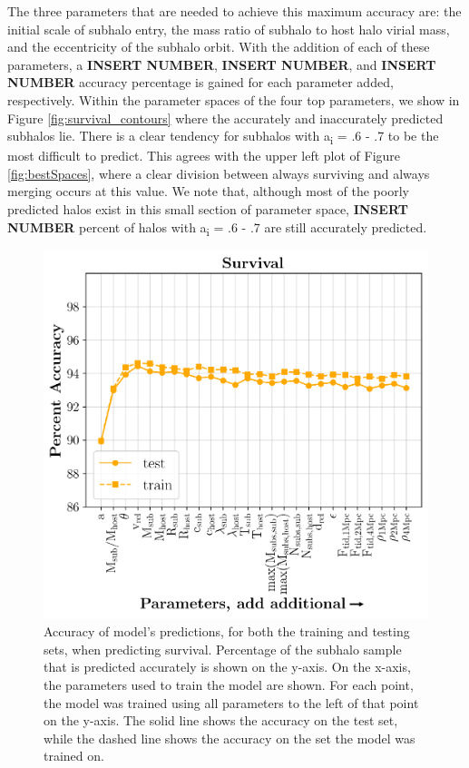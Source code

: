 \documentclass[fleqn,usenatbib]{mnras}
\begin{document}
The three parameters that are needed to achieve this maximum accuracy are: the initial scale of subhalo entry, the mass ratio of subhalo to host halo virial mass, and the eccentricity of the subhalo orbit. With the addition of each of these parameters, a \textbf{INSERT NUMBER}, \textbf{INSERT NUMBER}, and  \textbf{INSERT NUMBER} accuracy percentage is gained for each parameter added, respectively. Within the parameter spaces of the four top parameters, we show in Figure \ref{fig:survival_contours} where the accurately and inaccurately predicted subhalos lie. There is a clear tendency for subhalos with a\textsubscript{i} =  .6 - .7 to be the most difficult to predict. This agrees with the upper left plot of Figure \ref{fig:bestSpaces}, where a clear division between always surviving and always merging occurs at this value. We note that, although most of the poorly predicted halos exist in this small section of parameter space, \textbf{INSERT NUMBER} percent of halos with a\textsubscript{i} =  .6 - .7 are still accurately predicted.

\begin{figure}
	\includegraphics[width=\columnwidth]{Figures/survival_predictions}
    \caption{Accuracy of model's predictions, for both the training and testing sets, when predicting survival. Percentage of the subhalo sample that is predicted accurately is shown on the y-axis. On the x-axis, the parameters used to train the model are shown. For each point, the model was trained using all parameters to the left of that point on the y-axis. The solid line shows the accuracy on the test set, while the dashed line shows the accuracy on the set the model was trained on.}
    \label{fig:survival_predictions}
\end{figure}
\end{document}
